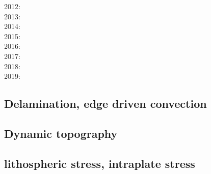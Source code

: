 2012: \cite{wagw12}\cite{vacl12}\cite{buit12}\cite{kogp12}\cite{gohg12}\cite{trub12}\\
2013: \cite{wazh13}\cite{krcu13}\cite{mutg13}\cite{frbm13}\cite{wagw13}\cite{duyp13}\cite{rugb13}
      \cite{scdg13}\\
2014: \cite{kava14}\cite{dusp14}\cite{wavp14}\cite{whbb14}\cite{scml14}
      \cite{mals14}\cite{gupm14}\cite{gahs14}\\
2015: \cite{wavp15}\cite{thkp15}\cite{mags15}\cite{duys15}\\
2016: \cite{wahz16}\\
2017: \cite{rugb17}\cite{ozgw17}\cite{vomc17}\cite{taac17}\\
2018: \cite{wavp18}\cite{nigw18}\cite{bemc18}\\
2019: \cite{koen19}\cite{kipd19}\cite{crcm19}\cite{pedm19}

\subsection*{Delamination, edge driven convection} 
 

\cite{kian95}
\cite{kian98}
\cite{kiri00}
\cite{modo04}
\cite{elki07}
\cite{gopy08}
\cite{vabv10}
\cite{vavg12}
\cite{krcu13}
\cite{baeg14}
\cite{bems17}

\subsection*{Dynamic topography} 

\cite{repa87}
\cite{kiha92}
\cite{bumo99}
\cite{cogu03}
\cite{cohu09}
\cite{bofb10}\cite{brau10b}\cite{stfh10}
\cite{rapy11}
\cite{shlm12}
\cite{brrs13}\cite{flgm13}
\cite{aupm15}\cite{kiff15}\cite{dali15}
\cite{yamm17}\cite{aumh17}
\cite{osss18}
\cite{deli19}

\subsection*{lithospheric stress, intraplate stress}

